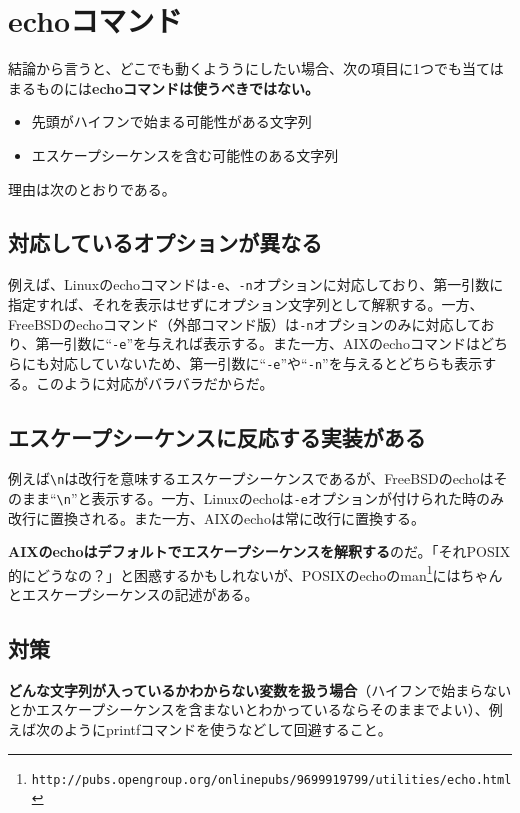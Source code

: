 \section{echoコマンド}

結論から言うと、どこでも動くよううにしたい場合、次の項目に1つでも当てはまるものには\textbf{echoコマンドは使うべきではない。}
\begin{itemize}
  \item 先頭がハイフンで始まる可能性がある文字列
  \item エスケープシーケンスを含む可能性のある文字列
\end{itemize}

理由は次のとおりである。

\subsection*{対応しているオプションが異なる}

例えば、Linuxのechoコマンドは\verb|-e|、\verb|-n|オプションに対応しており、第一引数に指定すれば、それを表示はせずにオプション文字列として解釈する。一方、FreeBSDのechoコマンド（外部コマンド版）は\verb|-n|オプションのみに対応しており、第一引数に``\verb|-e|''を与えれば表示する。また一方、AIXのechoコマンドはどちらにも対応していないため、第一引数に``\verb|-e|''や``\verb|-n|''を与えるとどちらも表示する。このように対応がバラバラだからだ。

\subsection*{エスケープシーケンスに反応する実装がある}

例えば\verb|\n|は改行を意味するエスケープシーケンスであるが、FreeBSDのechoはそのまま``\verb|\n|''と表示する。一方、Linuxのechoは\verb|-e|オプションが付けられた時のみ改行に置換される。また一方、AIXのechoは常に改行に置換する。

\textbf{AIXのechoはデフォルトでエスケープシーケンスを解釈する}のだ。「それPOSIX的にどうなの？」と困惑するかもしれないが、POSIXのechoのman\footnote{\verb|http://pubs.opengroup.org/onlinepubs/9699919799/utilities/echo.html|}にはちゃんとエスケープシーケンスの記述がある。

\subsection*{対策}

\textbf{どんな文字列が入っているかわからない変数を扱う場合}（ハイフンで始まらないとかエスケープシーケンスを含まないとわかっているならそのままでよい）、例えば次のようにprintfコマンドを使うなどして回避すること。

